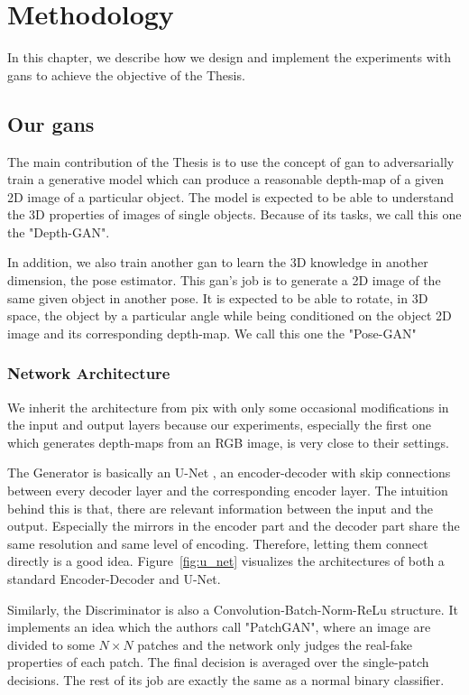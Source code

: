 \chapter{Methodology\label{cha:methodology}}
In this chapter, we describe how we design and implement the experiments with
\acrshort{gan}s to achieve the objective of the Thesis.

\section{Our \acrshort{gan}s }
The main contribution of the Thesis is to use the concept of \acrshort{gan} to
adversarially train a generative model which can produce a reasonable depth-map of a
given 2D image of a particular object. The model is expected to be able to
understand the 3D properties of images of single objects. Because of its tasks, we call
this one the "Depth-GAN".

In addition, we also train another \acrshort{gan} to learn the 3D knowledge in another
dimension, the pose estimator. This \acrshort{gan}'s job is to generate a 2D image of the
same given object in another pose. It is expected to be able to rotate, in 3D space, the
object by a particular angle while being conditioned on the object 2D image and its
corresponding depth-map. We call this one the "Pose-GAN"

\subsection{Network Architecture}
We inherit the architecture from \acrshort{pix} with only some occasional modifications in
the input and output layers because our experiments, especially the first one which
generates depth-maps from an RGB image, is very close to their settings. 

The Generator is basically an U-Net \cite{u_net}, an encoder-decoder with skip
connections between every decoder layer and the corresponding encoder layer. The intuition
behind this is that, there are relevant information between the input and the output.
Especially the mirrors in the encoder part and the decoder part share the same resolution
and same level of encoding. Therefore, letting them connect directly is a good idea.
Figure~\ref{fig:u_net} visualizes the architectures of both a standard Encoder-Decoder and
U-Net.

Similarly, the Discriminator is also a Convolution-Batch-Norm-ReLu structure. It
implements an idea which the authors call "PatchGAN", where an image are divided to some
$N \times N$ patches and the network only judges the real-fake properties of each patch.
The final decision is averaged over the single-patch decisions. The rest of its job are
exactly the same as a normal binary classifier.

